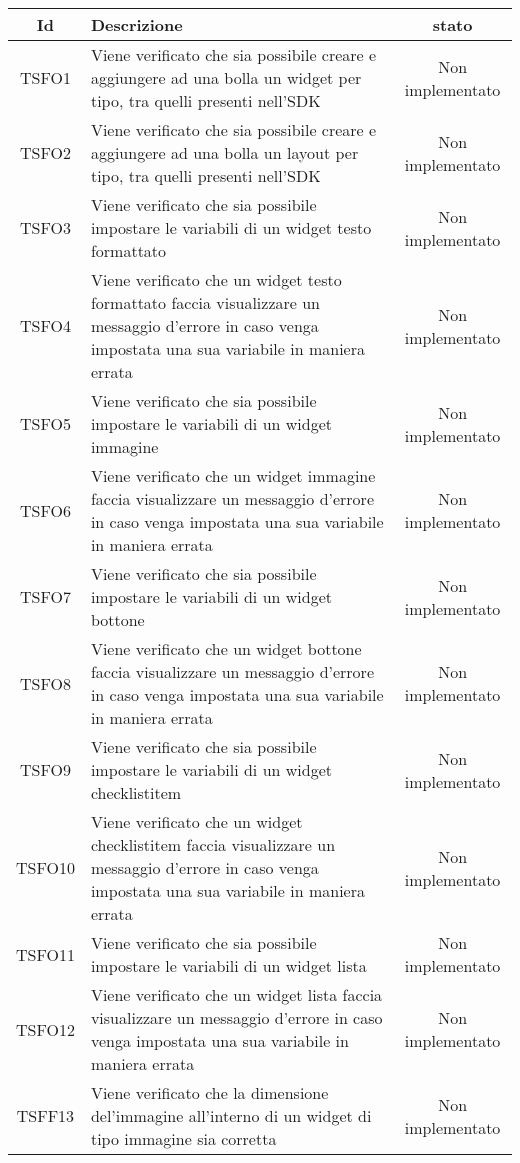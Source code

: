\begin{center}
	\begin{longtable}{|c|>{\centering}m{10cm}|c|}\hline
		Id & Descrizione & stato \\ \hline
		TSFO1 & Viene verificato che sia possibile creare e aggiungere ad una bolla un widget per tipo, tra quelli presenti nell'SDK & Non implementato \\ \hline
		TSFO2 & Viene verificato che sia possibile creare e aggiungere ad una bolla un layout per tipo, tra quelli presenti nell'SDK & Non implementato \\ \hline
		TSFO3 & Viene verificato che sia possibile impostare le variabili di un widget testo formattato & Non implementato \\ \hline
		TSFO4 & Viene verificato che un widget testo formattato faccia visualizzare un messaggio d'errore in caso venga impostata una sua variabile in maniera errata & Non implementato \\ \hline
		TSFO5 & Viene verificato che sia possibile impostare le variabili di un widget immagine & Non implementato \\ \hline
		TSFO6 & Viene verificato che un widget immagine faccia visualizzare un messaggio d'errore in caso venga impostata una sua variabile in maniera errata & Non implementato \\ \hline
		TSFO7 & Viene verificato che sia possibile impostare le variabili di un widget bottone & Non implementato \\ \hline
		TSFO8 & Viene verificato che un widget bottone faccia visualizzare un messaggio d'errore in caso venga impostata una sua variabile in maniera errata & Non implementato \\ \hline
		TSFO9 & Viene verificato che sia possibile impostare le variabili di un widget checklistitem & Non implementato \\ \hline
		TSFO10 & Viene verificato che un widget checklistitem faccia visualizzare un messaggio d'errore in caso venga impostata una sua variabile in maniera errata & Non implementato \\ \hline
		TSFO11 & Viene verificato che sia possibile impostare le variabili di un widget lista & Non implementato \\ \hline
		TSFO12 & Viene verificato che un widget lista faccia visualizzare un messaggio d'errore in caso venga impostata una sua variabile in maniera errata & Non implementato \\ \hline
		TSFF13 & Viene verificato che la dimensione del'immagine all'interno di un widget di tipo immagine sia corretta & Non implementato \\ \hline

\end{longtable}
\end{center}
